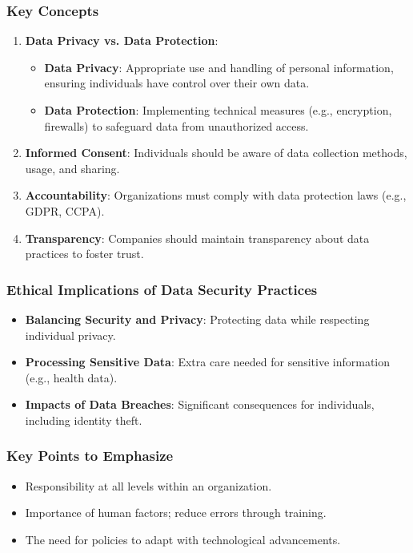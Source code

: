 \documentclass{beamer}
\begin{document}
\begin{frame}[fragile]
    \frametitle{Key Concepts}
    \begin{enumerate}
        \item \textbf{Data Privacy vs. Data Protection}:
            \begin{itemize}
                \item \textbf{Data Privacy}: Appropriate use and handling of personal information, ensuring individuals have control over their own data.
                \item \textbf{Data Protection}: Implementing technical measures (e.g., encryption, firewalls) to safeguard data from unauthorized access.
            \end{itemize}
        \item \textbf{Informed Consent}:
            Individuals should be aware of data collection methods, usage, and sharing.
        \item \textbf{Accountability}:
            Organizations must comply with data protection laws (e.g., GDPR, CCPA).
        \item \textbf{Transparency}:
            Companies should maintain transparency about data practices to foster trust.
    \end{enumerate}
\end{frame}

\begin{frame}[fragile]
    \frametitle{Ethical Implications of Data Security Practices}
    \begin{itemize}
        \item \textbf{Balancing Security and Privacy}: Protecting data while respecting individual privacy.
        \item \textbf{Processing Sensitive Data}: Extra care needed for sensitive information (e.g., health data).
        \item \textbf{Impacts of Data Breaches}: Significant consequences for individuals, including identity theft.
    \end{itemize}
\end{frame}

\begin{frame}[fragile]
    \frametitle{Key Points to Emphasize}
    \begin{itemize}
        \item Responsibility at all levels within an organization.
        \item Importance of human factors; reduce errors through training.
        \item The need for policies to adapt with technological advancements.
    \end{itemize}
\end{frame}
\end{document}
